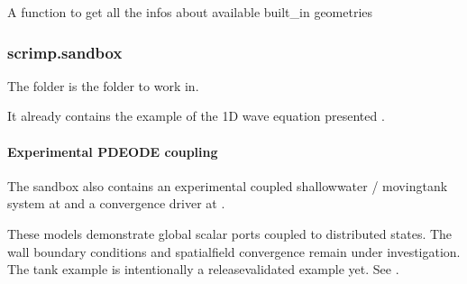\documentclass[letterpaper,10pt,english]{sphinxmanual}
\begin{document}

\begin{fulllineitems}
\label{\detokenize{scrimp.utils:scrimp.utils.mesh.built_in_geometries}}
\pysigstartsignatures
\pysiglinewithargsret
{}
{}
{}
\pysigstopsignatures
\sphinxAtStartPar
A function to get all the infos about available built\_in geometries

\end{fulllineitems}


\sphinxstepscope


\subsubsection{scrimp.sandbox}
\label{\detokenize{scrimp.sandbox:scrimp-sandbox}}\label{\detokenize{scrimp.sandbox::doc}}
\sphinxAtStartPar
The  folder is the  folder to work in.

\sphinxAtStartPar
It already contains the example of the 1D wave equation presented .


\paragraph{Experimental PDE\textendash{}ODE coupling}
\label{\detokenize{scrimp.sandbox:experimental-pde-ode-coupling}}
\sphinxAtStartPar
The sandbox also contains an experimental coupled shallow\sphinxhyphen{}water /
moving\sphinxhyphen{}tank system at  and a convergence
driver at .

\sphinxAtStartPar
These models demonstrate global scalar ports coupled to distributed
states. The wall boundary conditions and spatial\sphinxhyphen{}field convergence
remain under investigation. The tank example is intentionally 
a release\sphinxhyphen{}validated example yet. See .
\end{document}
